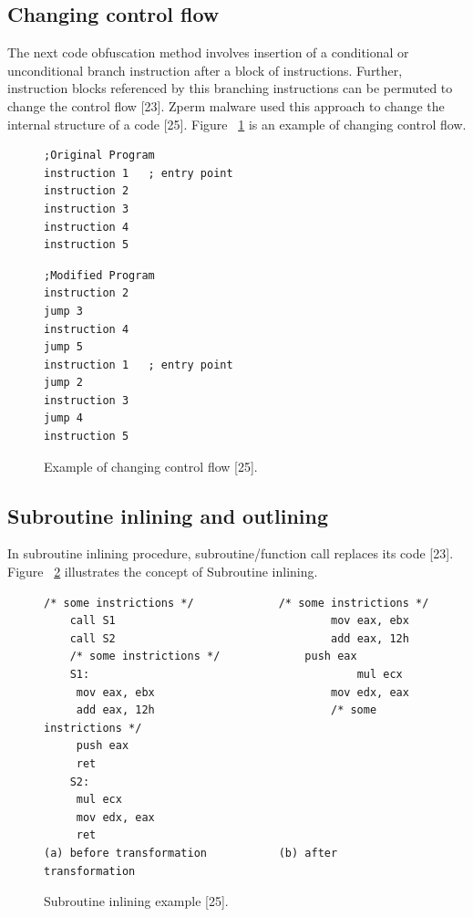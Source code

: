 \subsection{Changing control flow} 
The next code obfuscation method involves insertion of a conditional or unconditional branch instruction after a block of instructions. Further, instruction blocks referenced by this branching instructions can be permuted to change the control flow [23]. Zperm malware used this approach to change the internal structure of a code [25]. Figure ~\ref{fig:changecntflow} is an example of changing control flow.

\begin{figure}
  \centering
  \begin{lstlisting}[language=myasm]
;Original Program 
instruction 1   ; entry point
instruction 2
instruction 3
instruction 4
instruction 5
\end{lstlisting}

\begin{lstlisting}[language=myasm]
;Modified Program
instruction 2
jump 3
instruction 4
jump 5
instruction 1   ; entry point
jump 2
instruction 3
jump 4
instruction 5
\end{lstlisting}

    \caption[Example of changing control flow]{Example of changing control flow [25].}
    \label{fig:changecntflow}
\end{figure}

\subsection{Subroutine inlining and outlining} 
In subroutine inlining procedure, subroutine/function call replaces its code [23]. Figure ~\ref{fig:subroutineinline} illustrates the concept of Subroutine inlining. 

\begin{figure}
  \centering
  \begin{lstlisting}[language=myasm]
	/* some instrictions */				/* some instrictions */ 
	call S1									mov eax, ebx
	call S2									add eax, 12h
	/* some instrictions */				push eax
	S1: 										mul ecx
	 mov eax, ebx							mov edx, eax
	 add eax, 12h							/* some instrictions */
	 push eax					
	 ret						
	S2:							
	 mul ecx
	 mov edx, eax
	 ret
(a) before transformation			(b) after transformation
\end{lstlisting}


    \caption[Subroutine inlining example]{Subroutine inlining example [25].}
    \label{fig:subroutineinline}
\end{figure}

